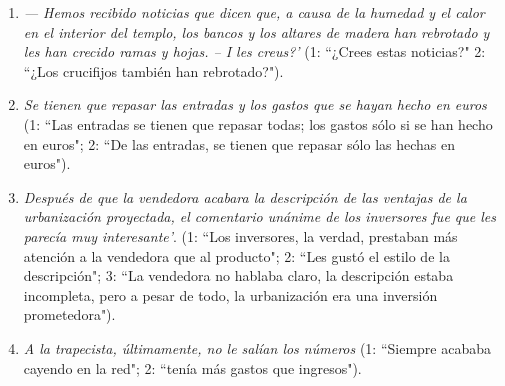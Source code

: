 \begin{enumerate}
\begin{enumerate}
\item \emph{--- Hemos recibido noticias que dicen que, a causa de la humedad y el calor en el interior del templo, los bancos y los altares de madera han rebrotado y les han crecido ramas y hojas. -- I les creus?'} (1: ``¿Crees estas noticias?" 2: ``¿Los crucifijos también han rebrotado?"). \item \emph{Se tienen que repasar las entradas y los gastos que se hayan hecho en euros} (1: ``Las entradas se tienen que repasar todas; los gastos sólo si se han hecho en euros"; 2: ``De las entradas, se tienen que repasar sólo las hechas en euros"). \item \emph{Después de que la vendedora acabara la descripción de las ventajas de la urbanización proyectada, el comentario unánime de los inversores fue que les parecía muy interesante'}. (1: ``Los inversores, la verdad, prestaban más atención a la vendedora que al producto"; 2: ``Les gustó el estilo de la descripción"; 3: ``La vendedora no hablaba claro, la descripción estaba incompleta, pero a pesar de todo, la urbanización era una inversión prometedora"). 

\item \emph{A la trapecista, últimamente, no le salían los números} (1: ``Siempre acababa cayendo en la red"; 2: ``tenía más gastos que ingresos"). 


\end{enumerate}
\end{enumerate}
